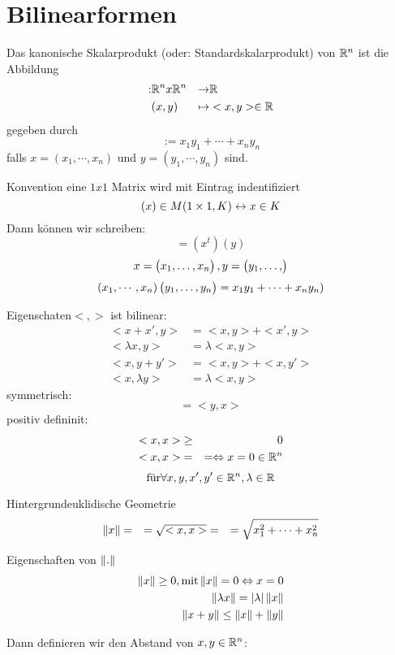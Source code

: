 \section{Bilinearformen}
Das kanonische Skalarprodukt (oder: Standardskalarprodukt) von $\mathbb{R}^n$ ist die Abbildung
\begin{align*}<,>: & \mb{R}^nx\mb{R}^n & \to & \mb{R}\\
 & (x,y) & \mapsto & <x,y>\in\mb{R}
\end{align*}
gegeben durch
\[<x,y>:=x_1y_1+\cdots+x_ny_n\]
falls $x=(x_1,\cdots,x_n)$ und $y=(y_1,\cdots,y_n)$ sind.
\begin{parquote}{Konvention}
eine $1x1$ Matrix wird mit Eintrag indentifiziert %
\[(x)\in{}M(1\times 1,K) \leftrightarrow x\in{}K\]
Dann können wir schreiben:
\[<x,y>=(x^t)(y)\]
\[x=\begin{pmatrix}x_1,\hdots,x_n\end{pmatrix}, y=\begin{pmatrix}y_1,\hdots,\end{pmatrix}\]
\[(x_1,\cdots,x_n)\begin{pmatrix}y_1,\hdots,y_n\end{pmatrix}=x_1y_1+\cdots+x_ny_n)\]
\end{parquote}
\begin{parquote}{Eigenschaten}$<,>$ ist bilinear: %
\begin{align*}
  <x+x',y>&=<x,y>+<x',y>\\
  <\lambda{}x,y>&=\lambda<x,y>\\
  <x,y+y'>&=<x,y>+<x,y'>\\
  <x,\lambda{}y>&=\lambda<x,y>
\end{align*}
symmetrisch:
\[<x,y>=<y,x>\]
positiv defininit:
\begin{align*}
  <x,x> &\geq& 0 \\
  <x,x> &=&= \Leftrightarrow x=0\in\mathbb{R}^n
\end{align*}
\[\text{für} \forall x,y,x',y'\in\mathbb{R}^n, \lambda\in\mathbb{R}\]
\end{parquote}
\begin{parquote}{Hintergrund}euklidische Geometrie
\begin{align*}
  \left\| x \right\|&=&=\sqrt{<x,x>}
  &=&=\sqrt{x^2_1+\cdots+x_n^2}
\end{align*}
\end{parquote}
\begin{parquote}{Eigenschaften von $\left\| . \right\|$}
\begin{align*}
  \left\| x \right\|\geq0, \text{mit} \left\| x \right\|=0 \Leftrightarrow x=0\\
  \left\| \lambda{}x \right\|=\left| \lambda \right|\left\| x \right\|\\
  \left\| x+y \right\|\leq\left\| x \right\|+\left\| y \right\|
\end{align*}
\end{parquote}
Dann definieren wir den Abstand von $x,y\in\mathbb{R}^n$:
